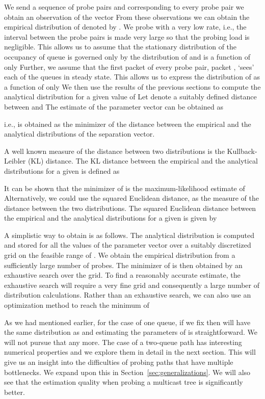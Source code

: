 \documentclass[11pt]{article}
\begin{document}
We send a sequence of probe pairs and corresponding to every probe
pair we obtain an observation of the vector  From these observations we can obtain
the empirical distribution of  denoted by
. We probe with a very low rate, i.e., the
interval between the probe pairs is made very large so that the
probing load is negligible.  This allows us to assume that the
stationary distribution of the occupancy of queue  is governed only
by the distribution of  and is a function of only
 Further, we assume that the first packet of
every probe pair, packet , `sees' each of the queues in steady
state. This allows us to express the distribution of  as a
function of only  We then use the results of the
previous sections to compute the analytical distribution
 for a given value of
 Let  denote a suitably
defined distance between  and
 The estimate
 of the parameter vector can be obtained as

i.e.,  is obtained as the minimizer of the
distance between the empirical and the analytical distributions of the
separation vector.  

A well known measure of the distance between two distributions is the
Kullback-Leibler (KL) distance. The KL distance between the empirical
and the analytical distributions for a given 
 is defined as

It can be shown that the minimizer of  is the maximum-likelihood estimate of 
Alternatively, we could use the squared Euclidean distance, as the
measure of the distance between the two distributions. The squared
Euclidean distance  between the empirical and the analytical distributions for a
given  is given by



A simplistic way to obtain  is as follows. The
analytical distribution is computed and stored for all the values of
the parameter vector  over a suitably discretized
grid on the feasible range of . We obtain the
empirical distribution  from a sufficiently
large number of probes. The minimizer of  is then obtained by an exhaustive search over the grid.  To
find a reasonably accurate estimate, the exhaustive search will
require a very fine grid and consequently a large number of
distribution calculations. Rather than an exhaustive search, we can
also use an optimization method to reach the minimum of


As we had mentioned earlier, for the case of one queue, if we fix
 then  will have the same distribution as  and
estimating the parameters of  is straightforward. We will
not pursue that any more. The case of a two-queue path has interesting
numerical properties and we explore them in detail in the next
section. This will give us an insight into the difficulties of probing
paths that have multiple bottlenecks. We expand upon this in
Section~\ref{sec:generalizations}. We will also see that the
estimation quality when probing a multicast tree is significantly
better.
\end{document}
